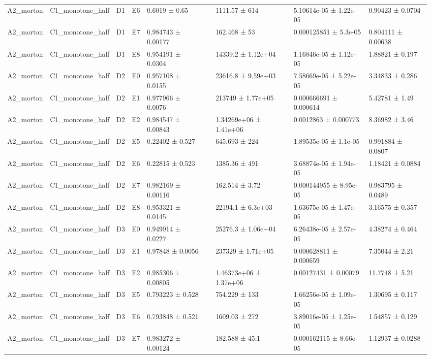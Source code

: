 \begin{table}
\begin{tabular}{lllllllll}
A2\_morton & C1\_monotone\_half & D1 & E6 & 0.6019 ± 0.65 &  & 1111.57 ± 614 & 5.10614e-05 ± 1.22e-05 & 0.90423 ± 0.0704 \\
A2\_morton & C1\_monotone\_half & D1 & E7 & 0.984743 ± 0.00177 &  & 162.468 ± 53 & 0.000125851 ± 5.3e-05 & 0.804111 ± 0.00638 \\
A2\_morton & C1\_monotone\_half & D1 & E8 & 0.954191 ± 0.0304 &  & 14339.2 ± 1.12e+04 & 1.16846e-05 ± 1.12e-05 & 1.88821 ± 0.197 \\
A2\_morton & C1\_monotone\_half & D2 & E0 & 0.957108 ± 0.0155 &  & 23616.8 ± 9.59e+03 & 7.58669e-05 ± 5.22e-05 & 3.34833 ± 0.286 \\
A2\_morton & C1\_monotone\_half & D2 & E1 & 0.977966 ± 0.0076 &  & 213749 ± 1.77e+05 & 0.000666691 ± 0.000614 & 5.42781 ± 1.49 \\
A2\_morton & C1\_monotone\_half & D2 & E2 & 0.984547 ± 0.00843 &  & 1.34269e+06 ± 1.41e+06 & 0.0012863 ± 0.000773 & 8.36982 ± 3.46 \\
A2\_morton & C1\_monotone\_half & D2 & E5 & 0.22402 ± 0.527 &  & 645.693 ± 224 & 1.89535e-05 ± 1.1e-05 & 0.991884 ± 0.0807 \\
A2\_morton & C1\_monotone\_half & D2 & E6 & 0.22815 ± 0.523 &  & 1385.36 ± 491 & 3.68874e-05 ± 1.94e-05 & 1.18421 ± 0.0884 \\
A2\_morton & C1\_monotone\_half & D2 & E7 & 0.982169 ± 0.00116 &  & 162.514 ± 3.72 & 0.000144955 ± 8.95e-05 & 0.983795 ± 0.0489 \\
A2\_morton & C1\_monotone\_half & D2 & E8 & 0.953321 ± 0.0145 &  & 22194.1 ± 6.3e+03 & 1.63675e-05 ± 1.47e-05 & 3.16575 ± 0.357 \\
A2\_morton & C1\_monotone\_half & D3 & E0 & 0.949914 ± 0.0227 &  & 25276.3 ± 1.06e+04 & 6.26438e-05 ± 2.57e-05 & 4.38274 ± 0.464 \\
A2\_morton & C1\_monotone\_half & D3 & E1 & 0.97848 ± 0.0056 &  & 237329 ± 1.71e+05 & 0.000628811 ± 0.000659 & 7.35044 ± 2.21 \\
A2\_morton & C1\_monotone\_half & D3 & E2 & 0.985306 ± 0.00805 &  & 1.46373e+06 ± 1.37e+06 & 0.00127431 ± 0.00079 & 11.7748 ± 5.21 \\
A2\_morton & C1\_monotone\_half & D3 & E5 & 0.793223 ± 0.528 &  & 754.229 ± 133 & 1.66256e-05 ± 1.09e-05 & 1.30695 ± 0.117 \\
A2\_morton & C1\_monotone\_half & D3 & E6 & 0.793848 ± 0.521 &  & 1609.03 ± 272 & 3.89016e-05 ± 1.25e-05 & 1.54857 ± 0.129 \\
A2\_morton & C1\_monotone\_half & D3 & E7 & 0.983272 ± 0.00124 &  & 182.588 ± 45.1 & 0.000162115 ± 8.66e-05 & 1.12937 ± 0.0288 \\

\end{tabular}
\end{table}
